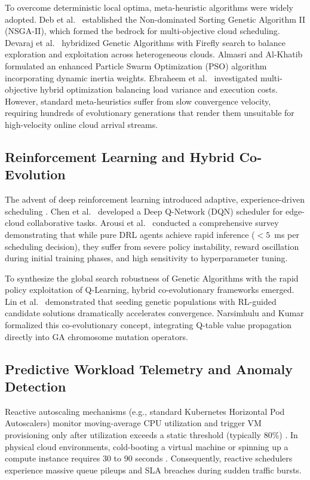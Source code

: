 \documentclass[default,sn-mathphys-num]{sn-jnl}
\theoremstyle{thmstyleone}
\theoremstyle{thmstyletwo}
\theoremstyle{thmstylethree}
\begin{document}
To overcome deterministic local optima, meta-heuristic algorithms were widely adopted. Deb et al.\ \cite{deb2002fast} established the Non-dominated Sorting Genetic Algorithm II (NSGA-II), which formed the bedrock for multi-objective cloud scheduling. Devaraj et al.\ \cite{devaraj2020multiobjective} hybridized Genetic Algorithms with Firefly search to balance exploration and exploitation across heterogeneous clouds. Almasri and Al-Khatib \cite{almasri2023multiobjective} formulated an enhanced Particle Swarm Optimization (PSO) algorithm incorporating dynamic inertia weights. Ebraheem et al.\ \cite{ebraheem2022task} investigated multi-objective hybrid optimization balancing load variance and execution costs. However, standard meta-heuristics suffer from slow convergence velocity, requiring hundreds of evolutionary generations that render them unsuitable for high-velocity online cloud arrival streams.

\subsection{Reinforcement Learning and Hybrid Co-Evolution}
The advent of deep reinforcement learning introduced adaptive, experience-driven scheduling \cite{mnih2015human}. Chen et al.\ \cite{chen2021deep} developed a Deep Q-Network (DQN) scheduler for edge-cloud collaborative tasks. Arousi et al.\ \cite{arousi2023reinforcement} conducted a comprehensive survey demonstrating that while pure DRL agents achieve rapid inference ($<5$~ms per scheduling decision), they suffer from severe policy instability, reward oscillation during initial training phases, and high sensitivity to hyperparameter tuning.

To synthesize the global search robustness of Genetic Algorithms with the rapid policy exploitation of Q-Learning, hybrid co-evolutionary frameworks emerged. Lin et al.\ \cite{lin2021hybrid} demonstrated that seeding genetic populations with RL-guided candidate solutions dramatically accelerates convergence. Narsimhulu and Kumar \cite{narsimhulu2026hybrid} formalized this co-evolutionary concept, integrating Q-table value propagation directly into GA chromosome mutation operators.

\subsection{Predictive Workload Telemetry and Anomaly Detection}
Reactive autoscaling mechanisms (e.g., standard Kubernetes Horizontal Pod Autoscalers) monitor moving-average CPU utilization and trigger VM provisioning only after utilization exceeds a static threshold (typically 80\%) \cite{weikert2023proactive}. In physical cloud environments, cold-booting a virtual machine or spinning up a compute instance requires 30 to 90 seconds \cite{calheiros2011cloudsim}. Consequently, reactive schedulers experience massive queue pileups and SLA breaches during sudden traffic bursts.
\end{document}
